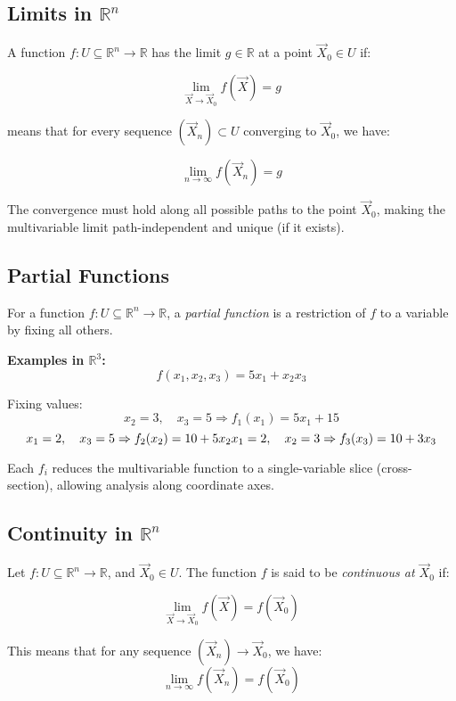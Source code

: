 \subsection{Limits in \( \mathbb{R}^n \)}

A function \( f : U \subseteq \mathbb{R}^n \to \mathbb{R} \) has the limit \( g \in \mathbb{R} \) at a point \( \vec{X}_0 \in U \) if:

\[
\lim_{\vec{X} \to \vec{X}_0} f(\vec{X}) = g
\]

means that for every sequence \( (\vec{X}_n) \subset U \) converging to \( \vec{X}_0 \), we have:

\[
\lim_{n \to \infty} f(\vec{X}_n) = g
\]

The convergence must hold along all possible paths to the point \( \vec{X}_0 \), making the multivariable limit path-independent and unique (if it exists).


\subsection{Partial Functions}

For a function \( f: U \subseteq \mathbb{R}^n \to \mathbb{R} \), a \emph{partial function} is a restriction of \( f \) to a variable by fixing all others.

\textbf{Examples in \( \mathbb{R}^3 \):}
\[
f(x_1, x_2, x_3) = 5x_1 + x_2 x_3
\]

Fixing values:
\[
x_2 = 3, \quad x_3 = 5 \Rightarrow f_1(x_1) = 5x_1 + 15 
\]
\[
x_1 = 2, \quad x_3 = 5 \Rightarrow f_2(x_2) = 10 + 5x_2 \\
x_1 = 2, \quad x_2 = 3 \Rightarrow f_3(x_3) = 10 + 3x_3
\]

Each \( f_i \) reduces the multivariable function to a single-variable slice (cross-section), allowing analysis along coordinate axes.


\subsection{Continuity in \( \mathbb{R}^n \)}

Let \( f : U \subseteq \mathbb{R}^n \to \mathbb{R} \), and \( \vec{X}_0 \in U \). The function \( f \) is said to be \emph{continuous at \( \vec{X}_0 \)} if:

\[
\lim_{\vec{X} \to \vec{X}_0} f(\vec{X}) = f(\vec{X}_0)
\]

This means that for any sequence \( (\vec{X}_n) \to \vec{X}_0 \), we have:
\[
\lim_{n \to \infty} f(\vec{X}_n) = f(\vec{X}_0)
\]

